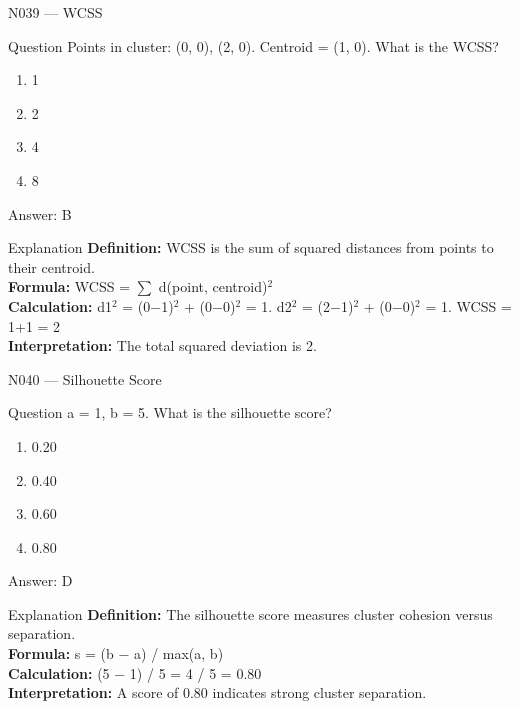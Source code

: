 \documentclass[aspectratio=169,8pt]{beamer}
\begin{document}
	\begin{frame}{N039 --- WCSS}
		\begin{block}{Question}
			Points in cluster: (0, 0), (2, 0). Centroid = (1, 0). What is the WCSS?
			\begin{enumerate}
				\item 1
				\item 2
				\item 4
				\item 8
			\end{enumerate}
		\end{block}
		\begin{exampleblock}{Answer: B}\end{exampleblock}
		\begin{block}{Explanation}
			\textbf{Definition:} WCSS is the sum of squared distances from points to their centroid.\\
			\textbf{Formula:} WCSS = $\sum$ d(point, centroid)$^{2}$\\
			\textbf{Calculation:} d1$^{2}$ = (0$-$1)$^{2}$ + (0$-$0)$^{2}$ = 1. d2$^{2}$ = (2$-$1)$^{2}$ + (0$-$0)$^{2}$ = 1. WCSS = 1+1 = 2\\
			\textbf{Interpretation:} The total squared deviation is 2.
		\end{block}
	\end{frame}
	
	\begin{frame}{N040 --- Silhouette Score}
		\begin{block}{Question}
			a = 1, b = 5. What is the silhouette score?
			\begin{enumerate}
				\item 0.20
				\item 0.40
				\item 0.60
				\item 0.80
			\end{enumerate}
		\end{block}
		\begin{exampleblock}{Answer: D}\end{exampleblock}
		\begin{block}{Explanation}
			\textbf{Definition:} The silhouette score measures cluster cohesion versus separation.\\
			\textbf{Formula:} s = (b $-$ a) / max(a, b)\\
			\textbf{Calculation:} (5 $-$ 1) / 5 = 4 / 5 = 0.80\\
			\textbf{Interpretation:} A score of 0.80 indicates strong cluster separation.
		\end{block}
	\end{frame}
	
\end{document}
